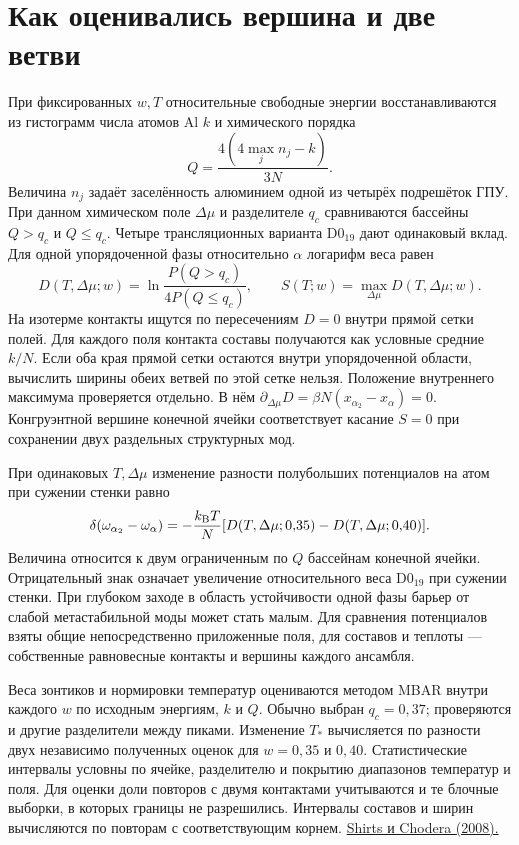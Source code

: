 \section*{Как оценивались вершина и две ветви}
При фиксированных \(w,T\) относительные свободные энергии восстанавливаются из гистограмм числа атомов Al \(k\) и химического порядка
\[
Q=\frac{4(4\max_j n_j-k)}{3N}.
\]
Величина \(n_j\) задаёт заселённость алюминием одной из четырёх подрешёток ГПУ. При данном химическом поле \(\Delta\mu\) и разделителе \(q_c\) сравниваются бассейны \(Q>q_c\) и \(Q\le q_c\). Четыре трансляционных варианта D0$_{19}$ дают одинаковый вклад. Для одной упорядоченной фазы относительно \(\alpha\) логарифм веса равен
\[
 D(T,\Delta\mu;w)=\ln\frac{P(Q>q_c)}{4P(Q\le q_c)},\qquad
 S(T;w)=\max_{\Delta\mu}D(T,\Delta\mu;w).
\]
На изотерме контакты ищутся по пересечениям \(D=0\) внутри прямой сетки полей. Для каждого поля контакта составы получаются как условные средние \(k/N\). Если оба края прямой сетки остаются внутри упорядоченной области, вычислить ширины обеих ветвей по этой сетке нельзя. Положение внутреннего максимума проверяется отдельно. В нём \(\partial_{\Delta\mu}D=\beta N(x_{\alpha_2}-x_\alpha)=0\). Конгруэнтной вершине конечной ячейки соответствует касание \(S=0\) при сохранении двух раздельных структурных мод.

При одинаковых \(T,\Delta\mu\) изменение разности полубольших потенциалов на атом при сужении стенки равно
\[
 \delta(\omega_{\alpha_2}-\omega_{\alpha})=
 -\frac{k_{\rm B}T}{N}[D(T,\Delta\mu;0{,}35)-D(T,\Delta\mu;0{,}40)].
\]
Величина относится к двум ограниченным по \(Q\) бассейнам конечной ячейки. Отрицательный знак означает увеличение относительного веса D0$_{19}$ при сужении стенки. При глубоком заходе в область устойчивости одной фазы барьер от слабой метастабильной моды может стать малым. Для сравнения потенциалов взяты общие непосредственно приложенные поля, для составов и теплоты --- собственные равновесные контакты и вершины каждого ансамбля.

Веса зонтиков и нормировки температур оцениваются методом MBAR внутри каждого \(w\) по исходным энергиям, \(k\) и \(Q\). Обычно выбран \(q_c=0{,}37\); проверяются и другие разделители между пиками. Изменение \(T_*\) вычисляется по разности двух независимо полученных оценок для \(w=0{,}35\) и \(0{,}40\). Статистические интервалы условны по ячейке, разделителю и покрытию диапазонов температур и поля. Для оценки доли повторов с двумя контактами учитываются и те блочные выборки, в которых границы не разрешились. Интервалы составов и ширин вычисляются по повторам с соответствующим корнем. \href{https://doi.org/10.1063/1.2978177}{Shirts и Chodera (2008).}
